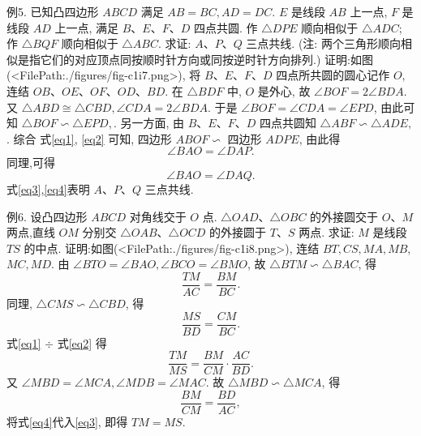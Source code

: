 例5. 已知凸四边形 $A B C D$ 满足 $A B=B C, A D=D C$. $E$ 是线段 $A B$ 上一点, $F$ 是线段 $A D$ 上一点, 满足 $B 、 E 、 F 、 D$ 四点共圆.
作 $\triangle D P E$ 顺向相似于 $\triangle A D C$; 作 $\triangle B Q F$ 顺向相似于 $\triangle A B C$. 求证: $A 、 P 、 Q$ 三点共线.
(注: 两个三角形顺向相似是指它们的对应顶点同按顺时针方向或同按逆时针方向排列.)
证明:如图(<FilePath:./figures/fig-c1i7.png>), 将 $B 、 E 、 F 、 D$ 四点所共圆的圆心记作 $O$, 连结 $O B 、 O E 、 O F 、 O D 、 B D$.
在 $\triangle B D F$ 中, $O$ 是外心, 故 $\angle B O F=2 \angle B D A$.
又 $\triangle A B D \cong \triangle C B D, \angle C D A=2 \angle B D A$.
于是 $\angle B O F=\angle C D A=\angle E P D$,
由此可知 $\triangle B O F \backsim \triangle E P D, \label{eq1}$.
另一方面, 由 $B 、 E 、 F 、 D$ 四点共圆知
$\triangle A B F \backsim \triangle A D E, \label{eq2}$.
综合 式\ref{eq1}, \ref{eq2} 可知, 四边形 $A B O F \backsim$ 四边形
$A D P E$, 由此得
$$
\angle B A O=\angle D A P . \label{eq3}
$$
同理,可得
$$
\angle B A O=\angle D A Q . \label{eq4}
$$
式\ref{eq3},\ref{eq4}表明 $A 、 P 、 Q$ 三点共线.



例6. 设凸四边形 $A B C D$ 对角线交于 $O$ 点.
$\triangle O A D 、 \triangle O B C$ 的外接圆交于 $O 、 M$ 两点,直线 $O M$ 分别交 $\triangle O A B 、 \triangle O C D$ 的外接圆于 $T 、 S$ 两点.
求证: $M$ 是线段 $T S$ 的中点.
证明:如图(<FilePath:./figures/fig-c1i8.png>), 连结 $B T, C S, M A, M B$, $M C, M D$.
由 $\angle B T O=\angle B A O, \angle B C O=\angle B M O$, 故 $\triangle B T M \backsim \triangle B A C$, 得
$$
\frac{T M}{A C}=\frac{B M}{B C} . \label{eq1}
$$
同理, $\triangle C M S \backsim \triangle C B D$, 得
$$
\frac{M S}{B D}=\frac{C M}{B C} . \label{eq2}
$$
式\ref{eq1} $\div$ 式\ref{eq2} 得 
$$
\frac{T M}{M S}=\frac{B M}{C M} \cdot \frac{A C}{B D} . \label{eq3}
$$
又 $\angle M B D=\angle M C A, \angle M D B=\angle M A C$.
故 $\triangle M B D \backsim \triangle M C A$, 得
$$
\frac{B M}{C M}=\frac{B D}{A C}, \label{eq4}
$$
将式\ref{eq4}代入\ref{eq3}, 即得 $T M=M S$.



